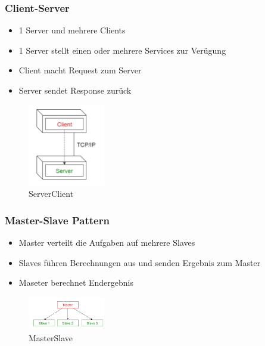 \documentclass[../ZF_SWEN1.tex]{subfiles}
\begin{document}
\subsubsection{Client-Server}

\begin{multicols}{2}
	\begin{itemize}
		\item 1 Server und mehrere Clients		
		\item 1 Server stellt einen oder mehrere Services zur Verügung		
		\item Client macht Request zum Server		
		\item Server sendet Response zurück		
	\end{itemize}
\columnbreak

\begin{figure}[H]			\includegraphics[width=0.3\textwidth] {Resources/Images/ServerClient.png}
\caption{\label{fig:ServerClient}ServerClient}
\end{figure}

\end{multicols}

\subsubsection{Master-Slave Pattern}

\begin{multicols}{2}
	\begin{itemize}
		\item Master verteilt die Aufgaben auf mehrere Slaves	
		\item Slaves führen Berechnungen aus und senden Ergebnis zum Master
		\item Maseter berechnet Endergebnis		
	\end{itemize}
\columnbreak

\begin{figure}[H]			\includegraphics[width=0.3\textwidth] {Resources/Images/MasterSlave.png}
\caption{\label{fig:MasterSlave}MasterSlave}
\end{figure}

\end{multicols}
\end{document}
